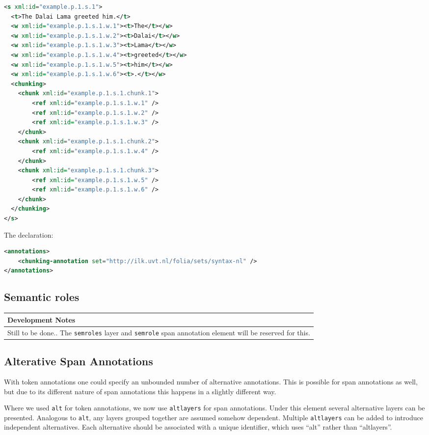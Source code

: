 \documentclass[a4paper,12pt]{report}
\newenvironment{devnotes}
{
\begin{center}
    \begin{tabular}[h!]{|p{0.8\textwidth}|}
    \hline
    {\bf Development Notes}\\\hline}
{   \\\hline
    \end{tabular}
\end{center}}
\begin{document}
\begin{lstlisting}[language=xml]
<s xml:id="example.p.1.s.1">
  <t>The Dalai Lama greeted him.</t>
  <w xml:id="example.p.1.s.1.w.1"><t>The</t></w>
  <w xml:id="example.p.1.s.1.w.2"><t>Dalai</t></w>
  <w xml:id="example.p.1.s.1.w.3"><t>Lama</t></w>
  <w xml:id="example.p.1.s.1.w.4"><t>greeted</t></w>
  <w xml:id="example.p.1.s.1.w.5"><t>him</t></w>
  <w xml:id="example.p.1.s.1.w.6"><t>.</t></w>
  <chunking>
    <chunk xml:id="example.p.1.s.1.chunk.1">       
        <ref xml:id="example.p.1.s.1.w.1" />       
        <ref xml:id="example.p.1.s.1.w.2" />       
        <ref xml:id="example.p.1.s.1.w.3" />        
    </chunk>
    <chunk xml:id="example.p.1.s.1.chunk.2">       
        <ref xml:id="example.p.1.s.1.w.4" />
    </chunk>
    <chunk xml:id="example.p.1.s.1.chunk.3">       
        <ref xml:id="example.p.1.s.1.w.5" />
        <ref xml:id="example.p.1.s.1.w.6" />
    </chunk>    
  </chunking>
</s>
\end{lstlisting}


The declaration:

\begin{lstlisting}[language=xml]
<annotations>
    <chunking-annotation set="http://ilk.uvt.nl/folia/sets/syntax-nl" />
</annotations>
\end{lstlisting}



\subsection{Semantic roles}

\begin{devnotes}
Still to be done.. The \texttt{semroles} layer and \texttt{semrole} span annotation element will be reserved for this.
\end{devnotes}

\subsection{Alterative Span Annotations}

With token annotations one could specify an unbounded number of alternative annotations. This is possible for span annotations as well, but due to its different nature of span annotations this happens in a slightly different way.

Where we used \texttt{alt} for token annotations, we now use \texttt{altlayers} for span annotations. Under this element several alternative layers can be presented. Analogous to \texttt{alt}, any layers grouped together are assumed somehow dependent. Multiple \texttt{altlayers} can be added to introduce independent alternatives. Each alternative should be associated with a unique identifier, which uses ``alt'' rather than ``altlayers''. 
\end{document}
